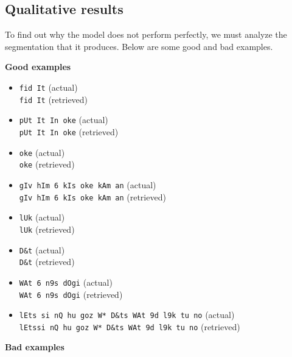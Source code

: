 
\subsection{Qualitative results}

To find out why the model does not perform perfectly, we must analyze the segmentation that it produces. Below are some good and bad examples.\\


\begin{multicols}{2}
\noindent\textbf{Good examples}

\begin{itemize}
\item \texttt{fid It} (actual)\\ \texttt{fid It} (retrieved)
\item \texttt{pUt It In oke} (actual)\\ \texttt{pUt It In oke} (retrieved)
\item \texttt{oke} (actual)\\ \texttt{oke} (retrieved)
\item \texttt{gIv hIm 6 kIs oke kAm an} (actual)\\ \texttt{gIv hIm 6 kIs oke kAm an} (retrieved)
\item \texttt{lUk} (actual)\\ \texttt{lUk} (retrieved)
\item \texttt{D\&t} (actual)\\ \texttt{D\&t} (retrieved)
\item \texttt{WAt 6 n9s dOgi} (actual)\\ \texttt{WAt 6 n9s dOgi} (retrieved)
\item \texttt{lEts si nQ hu goz W* D\&ts WAt 9d l9k tu no} (actual)\\ \texttt{lEtssi nQ hu goz W* D\&ts WAt 9d l9k tu no} (retrieved)
\end{itemize}
\vfill
\columnbreak
\noindent\textbf{Bad examples}


\end{multicols}
